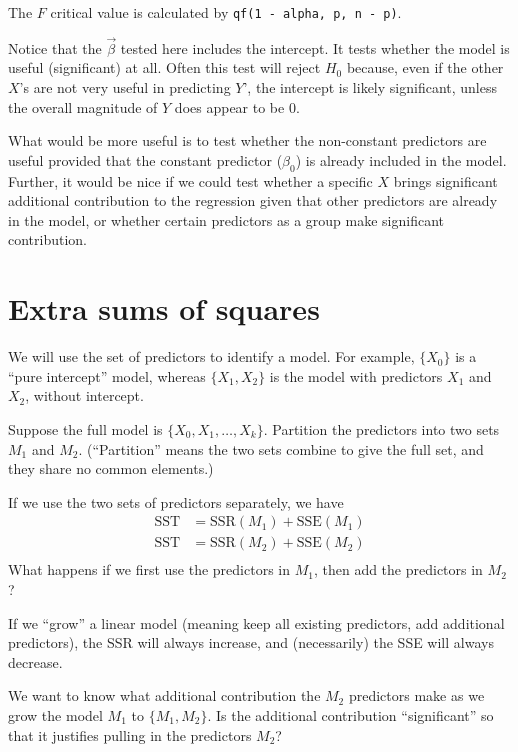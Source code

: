 \documentclass[12pt]{article}
\begin{document}
\alert[R tip]%
The $F$ critical value is calculated by
\verb+qf(1 - alpha, p, n - p)+.

Notice that the $\vec{\beta}$ tested here includes
the intercept.
It tests whether the model is useful (significant) at all.
Often this test will reject $H_0$ because,
even if the other $X$'s are not very useful in predicting $Y$',
the intercept is likely significant,
unless the overall magnitude of $Y$ does appear to be 0.

What would be more useful is to test whether the non-constant
predictors are useful provided that the constant predictor ($\beta_0$)
is already included in the model.
Further,
it would be nice if we could test whether a specific $X$
brings significant additional contribution to the regression
given that other predictors are already in the model,
or whether certain predictors as a group make significant contribution.

\section{Extra sums of squares}

We will use the set of predictors to identify a model.
For example,
$\{X_0\}$ is a ``pure intercept'' model,
whereas
$\{X_1, X_2\}$ is the model with predictors $X_1$ and $X_2$,
without intercept.

Suppose the full model is
$\{X_0, X_1, \dotsc, X_k\}$.
Partition the predictors into two sets $M_1$ and $M_2$.
(``Partition'' means the two sets combine to give the full set,
and they share no common elements.)

If we use the two sets of predictors separately, we have
\[\begin{split}
\text{SST} &= \text{SSR}(M_1) + \text{SSE}(M_1)\\
\text{SST} &= \text{SSR}(M_2) + \text{SSE}(M_2)\\
\end{split}
\]
What happens if we first use the predictors in $M_1$,
then add the predictors in $M_2$?

\theorem
If we ``grow'' a linear model (meaning keep all existing predictors,
add additional predictors), the SSR will always increase,
and (necessarily) the SSE will always decrease.

We want to know what additional contribution the $M_2$ predictors make
as we grow the model $M_1$ to $\{M_1, M_2\}$.
Is the additional contribution ``significant'' so that it justifies
pulling in the predictors $M_2$?
\end{document}
